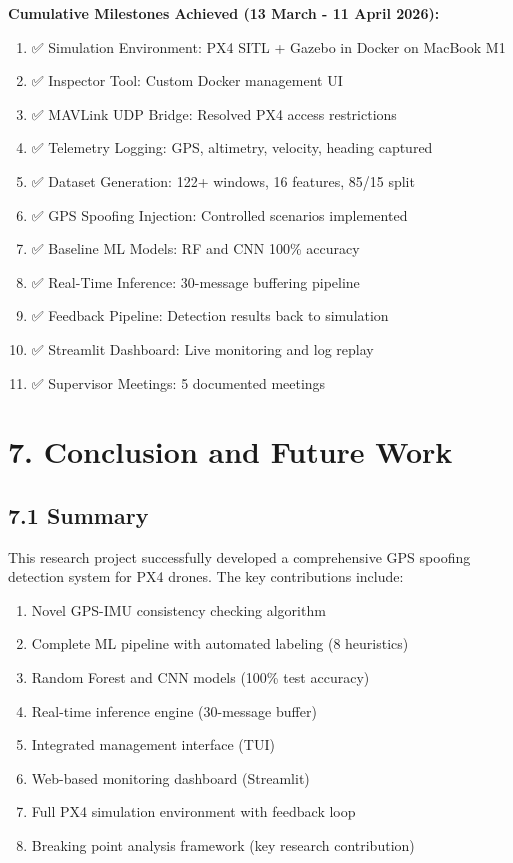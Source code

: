 \documentclass[12pt,a4paper]{article}
\begin{document}
\textbf{Cumulative Milestones Achieved (13 March - 11 April 2026):}
\begin{enumerate}
    \item ✅ Simulation Environment: PX4 SITL + Gazebo in Docker on MacBook M1
    \item ✅ Inspector Tool: Custom Docker management UI
    \item ✅ MAVLink UDP Bridge: Resolved PX4 access restrictions
    \item ✅ Telemetry Logging: GPS, altimetry, velocity, heading captured
    \item ✅ Dataset Generation: 122+ windows, 16 features, 85/15 split
    \item ✅ GPS Spoofing Injection: Controlled scenarios implemented
    \item ✅ Baseline ML Models: RF and CNN 100\% accuracy
    \item ✅ Real-Time Inference: 30-message buffering pipeline
    \item ✅ Feedback Pipeline: Detection results back to simulation
    \item ✅ Streamlit Dashboard: Live monitoring and log replay
    \item ✅ Supervisor Meetings: 5 documented meetings
\end{enumerate}

\newpage

\section{7. Conclusion and Future Work}

\subsection{7.1 Summary}

This research project successfully developed a comprehensive GPS spoofing detection system for PX4 drones. The key contributions include:

\begin{enumerate}
    \item Novel GPS-IMU consistency checking algorithm
    \item Complete ML pipeline with automated labeling (8 heuristics)
    \item Random Forest and CNN models (100\% test accuracy)
    \item Real-time inference engine (30-message buffer)
    \item Integrated management interface (TUI)
    \item Web-based monitoring dashboard (Streamlit)
    \item Full PX4 simulation environment with feedback loop
    \item Breaking point analysis framework (key research contribution)
\end{enumerate}
\end{document}
